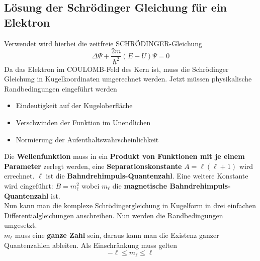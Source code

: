 \documentclass[12pt,a4paper,ngerman]{article}
\begin{document}
\subsection{Lösung der Schrödinger Gleichung für ein Elektron}
Verwendet wird hierbei die zeitfreie SCHRÖDINGER-Gleichung
\begin{equation}
\Delta \Psi + \frac{2m}{\hbar^2}(E-U)\Psi = 0
\end{equation}
Da das Elektron im COULOMB-Feld des Kern ist, muss die Schrödinger Gleichung in Kugelkoordinaten umgerechnet werden. Jetzt müssen physikalische Randbedingungen eingeführt werden
\begin{itemize}
\item Eindeutigkeit auf der Kugeloberfläche
\item Verschwinden der Funktion im Unendlichen
\item Normierung der Aufenthaltswahrscheinlichkeit
\end{itemize}
Die \textbf{Wellenfunktion} muss in ein \textbf{Produkt von Funktionen mit je einem Parameter} zerlegt werden, eine \textbf{Separationskonstante} $A = \ell(\ell+1)$ wird errechnet. $\ell$ ist die \textbf{Bahndrehimpuls-Quantenzahl}. Eine weitere Konstante wird eingeführt: $B = m_\ell^2$ wobei $m_\ell$ die \textbf{magnetische Bahndrehimpuls-Quantenzahl} ist. \\
Nun kann man die komplexe Schrödingergleichung in Kugelform in drei einfachen Differentialgleichungen anschreiben. Nun werden die Randbedingungen umgesetzt. \\
$m_\ell$ muss eine \textbf{ganze Zahl} sein, daraus kann man die Existenz ganzer Quantenzahlen ableiten. Als Einschränkung muss gelten
\begin{equation}
- \ell \leq m_\ell \leq \ell
\end{equation}
\end{document}
